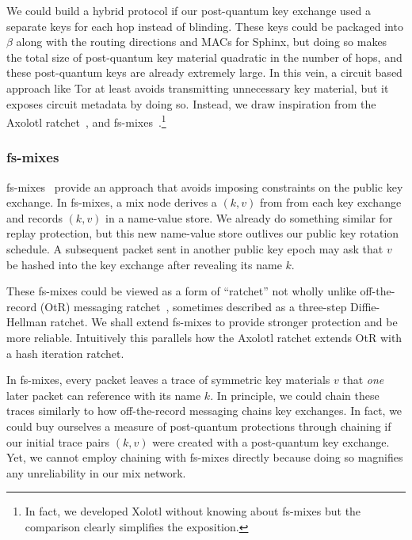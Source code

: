 We could build a hybrid protocol if our post-quantum key exchange
used a separate keys for each hop instead of blinding.  These keys
could be packaged into $\beta$ along with the routing directions and
MACs for Sphinx, but doing so makes the total size of post-quantum 
key material quadratic in the number of hops, and these post-quantum
keys are already extremely large.
In this vein, a circuit based approach like Tor at least avoids
transmitting unnecessary key material, but it exposes circuit
metadata by doing so. 
Instead, we draw inspiration from the Axolotl
ratchet~\cite{TextSecure}, and fs-mixes~\cite{fs-mix}.\footnote{In
  fact, we developed Xolotl without knowing about fs-mixes but the
  comparison clearly simplifies the exposition.}

\subsubsection{fs-mixes}

fs-mixes~\cite{fs-mix} provide an approach that
avoids imposing constraints on the public key exchange.  In fs-mixes,
a mix node derives a $(k,v)$ from from each key exchange and records
$(k,v)$ in a name-value store.  We already do something similar for 
replay protection, but this new name-value store outlives our public
key rotation schedule.  A subsequent packet sent in another public
key epoch may ask that $v$ be hashed into the key exchange after
revealing its name $k$.  

These fs-mixes could be viewed as a form of ``ratchet'' not wholly
unlike off-the-record (OtR) messaging ratchet~\cite{OtR},
sometimes described as a three-step Diffie-Hellman ratchet.  
We shall extend fs-mixes to provide stronger protection and be more
reliable.  Intuitively this parallels how the Axolotl 
ratchet extends OtR with a hash iteration ratchet.

In fs-mixes, every packet leaves a trace of symmetric
key materials $v$ that {\it one} later packet can reference with its
name $k$.  In principle, we could chain these traces similarly to
how off-the-record messaging \cite{OtR} chains key exchanges.
In fact, we could buy ourselves a measure of post-quantum protections
through chaining if our initial trace pairs $(k,v)$ were created with
a post-quantum key exchange.  Yet, we cannot employ chaining with
fs-mixes directly because doing so magnifies any unreliability in
our mix network. 


